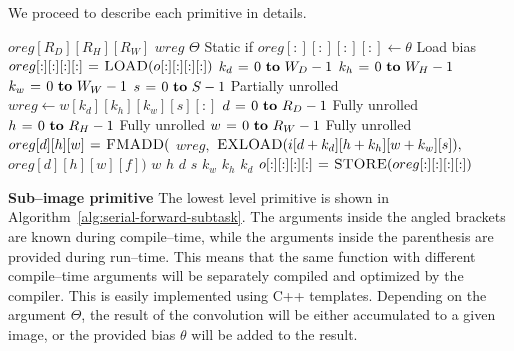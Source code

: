   We proceed to describe each primitive in details.

  \begin{algorithm}
    {\footnotesize
      \begin{codebox}
        \li {} $oreg[R_D][R_H][R_W]$
        \li {} $wreg$
        \li \If $\Theta$ \Comment Static if
        \li \Then $oreg[:][:][:][:] \gets \theta$ \Comment Load bias
        \li \Else
        \li       $oreg[:][:][:][:] \mathrel{\hspace{1pt}=\hspace{1pt}} \textnormal{\scshape LOAD}(o[:][:][:][:])$
        \End \li {}
        \li {} $k_d \gets 0 \To W_D-1$
        \li   \Do {} $k_h \gets 0 \To W_H-1$
        \li      \Do {} $k_w \gets 0 \To W_W-1$
        \li         \Do {} $s \gets 0 \To S - 1$ \Comment Partially unrolled
        \li         \Do $wreg \gets w[k_d][k_h][k_w][s][:]$
        \li {} $d \gets 0 \To R_D-1$ \Comment Fully unrolled
        \li   \Do {} $h \gets 0 \To R_H-1$ \Comment Fully unrolled
        \li      \Do {} $w \gets 0 \To R_W-1$ \Comment Fully unrolled
        \li         \Do $oreg[d][h][w] \mathrel{\hspace{1pt}=\hspace{1pt}} \textnormal{\scshape FMADD}($
        \li   \Do $wreg,$
        \li       $\textnormal{\scshape EXLOAD}(i[d+k_d][h+k_h][w+k_w][s]),$
        \li       $oreg[d][h][w][f])$
        \End \li {} $w$
        \End \li {} $h$
        \End \li {} $d$
        \End \li {} $s$
        \End \li {} $k_w$
        \End \li {} $k_h$
        \End \li {} $k_d$
        \li $o[:][:][:][:] \mathrel{\hspace{1pt}=\hspace{1pt}} \textnormal{\scshape STORE}(oreg[:][:][:][:])$
      \end{codebox}
    \caption{The finest granularity primitive that computes a
      sub--image of size $R_D \times R_H \times R_W$ of $S$ images by
      performing $S^2$ convolutions on $S$ input images with a kernel
      of size $W_D \times W_H \times W_W$.}
    \label{alg:serial-forward-subtask}
    }
  \end{algorithm}

  {\bf Sub--image primitive} \quad The lowest level primitive is shown
  in Algorithm~\ref{alg:serial-forward-subtask}.  The arguments inside
  the angled brackets are known during compile--time, while the
  arguments inside the parenthesis are provided during run--time.
  This means that the same function with different compile--time
  arguments will be separately compiled and optimized by the compiler.
  This is easily implemented using C++ templates.  Depending on the
  argument $\Theta$, the result of the convolution will be either
  accumulated to a given image, or the provided bias $\theta$ will be
  added to the result.

